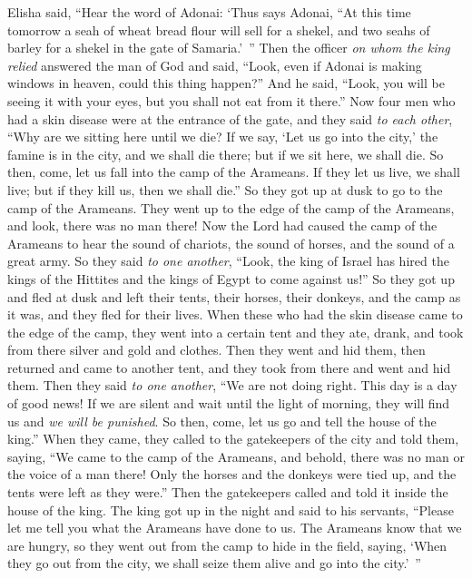 \begin{biblechapter} %
 Elisha said, “Hear the word of Adonai: ‘Thus says Adonai, “At this time tomorrow a seah of wheat bread flour will sell for a shekel, and two seahs of barley for a shekel in the gate of Samaria.’ ”
\verse Then the officer \textit{on whom the king relied} answered the man of God and said, “Look, even if Adonai is making windows in heaven, could this thing happen?” And he said, “Look, you will be seeing it with your eyes, but you shall not eat from it there.”
 Now four men who had a skin disease were at the entrance of the gate, and they said \textit{to each other}, “Why are we sitting here until we die?
\verse If we say, ‘Let us go into the city,’ the famine is in the city, and we shall die there; but if we sit here, we shall die. So then, come, let us fall into the camp of the Arameans. If they let us live, we shall live; but if they kill us, then we shall die.”
\verse So they got up at dusk to go to the camp of the Arameans. They went up to the edge of the camp of the Arameans, and look, there was no man there!
\verse Now the Lord had caused the camp of the Arameans to hear the sound of chariots, the sound of horses, and the sound of a great army. So they said \textit{to one another}, “Look, the king of Israel has hired the kings of the Hittites and the kings of Egypt to come against us!”
\verse So they got up and fled at dusk and left their tents, their horses, their donkeys, and the camp as it was, and they fled for their lives.
\verse When these who had the skin disease came to the edge of the camp, they went into a certain tent and they ate, drank, and took from there silver and gold and clothes. Then they went and hid them, then returned and came to another tent, and they took from there and went and hid them.
\verse Then they said \textit{to one another}, “We are not doing right. This day is a day of good news! If we are silent and wait until the light of morning, they will find us and \textit{we will be punished}. So then, come, let us go and tell the house of the king.”
\verse When they came, they called to the gatekeepers of the city and told them, saying, “We came to the camp of the Arameans, and behold, there was no man or the voice of a man there! Only the horses and the donkeys were tied up, and the tents were left as they were.”
\verse Then the gatekeepers called and told it inside the house of the king.
\verse The king got up in the night and said to his servants, “Please let me tell you what the Arameans have done to us. The Arameans know that we are hungry, so they went out from the camp to hide in the field, saying, ‘When they go out from the city, we shall seize them alive and go into the city.’ ”

\end{biblechapter}
